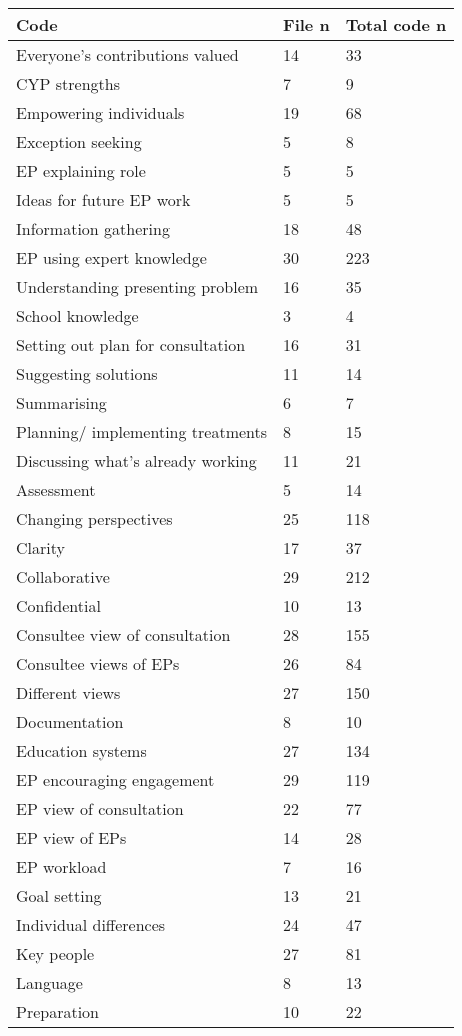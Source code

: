 \documentclass[
]{article}
\begin{document}
\begin{longtable}[]{@{}lll@{}}
\toprule
Code & File n & Total code n \\
\midrule
\endhead
Everyone's contributions valued & 14 & 33 \\
CYP strengths & 7 & 9 \\
Empowering individuals & 19 & 68 \\
Exception seeking & 5 & 8 \\
EP explaining role & 5 & 5 \\
Ideas for future EP work & 5 & 5 \\
Information gathering & 18 & 48 \\
EP using expert knowledge & 30 & 223 \\
Understanding presenting problem & 16 & 35 \\
School knowledge & 3 & 4 \\
Setting out plan for consultation & 16 & 31 \\
Suggesting solutions & 11 & 14 \\
Summarising & 6 & 7 \\
Planning/ implementing treatments & 8 & 15 \\
Discussing what's already working & 11 & 21 \\
Assessment & 5 & 14 \\
Changing perspectives & 25 & 118 \\
Clarity & 17 & 37 \\
Collaborative & 29 & 212 \\
Confidential & 10 & 13 \\
Consultee view of consultation & 28 & 155 \\
Consultee views of EPs & 26 & 84 \\
Different views & 27 & 150 \\
Documentation & 8 & 10 \\
Education systems & 27 & 134 \\
EP encouraging engagement & 29 & 119 \\
EP view of consultation & 22 & 77 \\
EP view of EPs & 14 & 28 \\
EP workload & 7 & 16 \\
Goal setting & 13 & 21 \\
Individual differences & 24 & 47 \\
Key people & 27 & 81 \\
Language & 8 & 13 \\
Preparation & 10 & 22 \\

\end{longtable}
\end{document}
